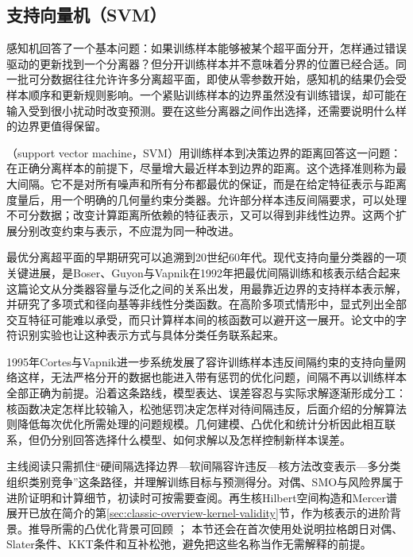 \subsection{支持向量机（SVM）}
\label{sec:classification-svm}

感知机回答了一个基本问题：如果训练样本能够被某个超平面分开，怎样通过错误驱动的更新找到一个分离器？但分开训练样本并不意味着分界的位置已经合适。同一批可分数据往往允许许多分离超平面，即使从零参数开始，感知机的结果仍会受样本顺序和更新规则影响。一个紧贴训练样本的边界虽然没有训练错误，却可能在输入受到很小扰动时改变预测。要在这些分离器之间作出选择，还需要说明什么样的边界更值得保留。

（support vector machine，SVM）用训练样本到决策边界的距离回答这一问题：在正确分离样本的前提下，尽量增大最近样本到边界的距离。这个选择准则称为最大间隔。它不是对所有噪声和所有分布都最优的保证，而是在给定特征表示与距离度量后，用一个明确的几何量约束分类器。允许部分样本违反间隔要求，可以处理不可分数据；改变计算距离所依赖的特征表示，又可以得到非线性边界。这两个扩展分别改变约束与表示，不应混为同一种改进。

最优分离超平面的早期研究可以追溯到20世纪60年代。现代支持向量分类器的一项关键进展，是Boser、Guyon与Vapnik在1992年把最优间隔训练和核表示结合起来这篇论文从分类器容量与泛化之间的关系出发，用最靠近边界的支持样本表示解，并研究了多项式和径向基等非线性分类函数。在高阶多项式情形中，显式列出全部交互特征可能难以承受，而只计算样本间的核函数可以避开这一展开。论文中的字符识别实验也让这种表示方式与具体分类任务联系起来。

1995年Cortes与Vapnik进一步系统发展了容许训练样本违反间隔约束的支持向量网络这样，无法严格分开的数据也能进入带有惩罚的优化问题，间隔不再以训练样本全部正确为前提。沿着这条路线，模型表达、误差容忍与实际求解逐渐形成分工：核函数决定怎样比较输入，松弛惩罚决定怎样对待间隔违反，后面介绍的分解算法则降低每次优化所需处理的问题规模。几何建模、凸优化和统计分析因此相互联系，但仍分别回答选择什么模型、如何求解以及怎样控制新样本误差。

主线阅读只需抓住“硬间隔选择边界—软间隔容许违反—核方法改变表示—多分类组织类别竞争”这条路径，并理解训练目标与预测得分。对偶、SMO与风险界属于进阶证明和计算细节，初读时可按需要查阅。再生核Hilbert空间构造和Mercer谱展开已放在简介的第\ref{sec:classic-overview-kernel-validity}节，作为核表示的进阶背景。推导所需的凸优化背景可回顾
；
本节还会在首次使用处说明拉格朗日对偶、Slater条件、KKT条件和互补松弛，避免把这些名称当作无需解释的前提。

